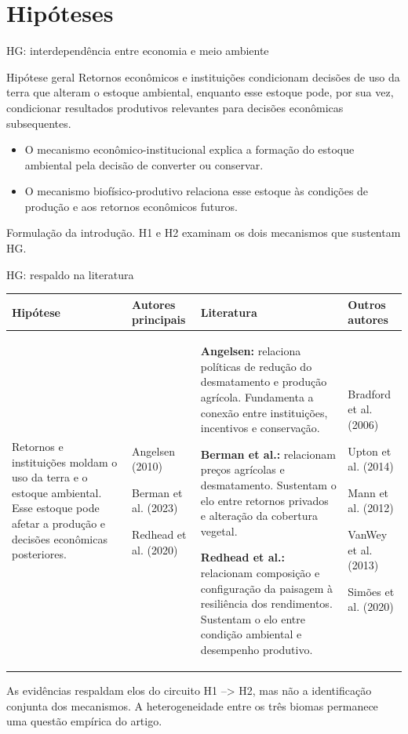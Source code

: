 \documentclass[aspectratio=169,11pt]{beamer}
\newcommand{\fonte}[1]{\par\vfill{\fontsize{7.5}{9}\selectfont\color{gray}#1\par}}
\newcommand{\tpar}{\par\vspace{1.5mm}}
\begin{document}
\section{Hipóteses}
\begin{frame}{HG: interdependência entre economia e meio ambiente}
\begin{block}{Hipótese geral}
Retornos econômicos e instituições condicionam decisões de uso da terra que alteram o estoque ambiental, enquanto esse estoque pode, por sua vez, condicionar resultados produtivos relevantes para decisões econômicas subsequentes.
\end{block}
\medskip
\begin{itemize}
\item O mecanismo econômico-institucional explica a formação do estoque ambiental pela decisão de converter ou conservar.
\medskip
\item O mecanismo biofísico-produtivo relaciona esse estoque às condições de produção e aos retornos econômicos futuros.
\end{itemize}
\fonte{Formulação da introdução. H1 e H2 examinam os dois mecanismos que sustentam HG.}
\end{frame}

\begin{frame}{HG: respaldo na literatura}
\fontsize{8.5}{10.6}\selectfont
\setlength{\tabcolsep}{4pt}
\begin{tabularx}{\textwidth}{P{2.6cm} P{2.25cm} X P{2.25cm}}
\toprule
\textbf{Hipótese} & \textbf{Autores principais} & \textbf{Literatura} & \textbf{Outros autores} \\
\midrule
Retornos e instituições moldam o uso da terra e o estoque ambiental. Esse estoque pode afetar a produção e decisões econômicas posteriores.
& Angelsen (2010)\tpar Berman et al. (2023)\tpar Redhead et al. (2020)
& \textbf{Angelsen:} relaciona políticas de redução do desmatamento e produção agrícola. Fundamenta a conexão entre instituições, incentivos e conservação.\tpar
\textbf{Berman et al.:} relacionam preços agrícolas e desmatamento. Sustentam o elo entre retornos privados e alteração da cobertura vegetal.\tpar
\textbf{Redhead et al.:} relacionam composição e configuração da paisagem à resiliência dos rendimentos. Sustentam o elo entre condição ambiental e desempenho produtivo.
& Bradford et al. (2006)\tpar Upton et al. (2014)\tpar Mann et al. (2012)\tpar VanWey et al. (2013)\tpar Simões et al. (2020) \\
\bottomrule
\end{tabularx}
\fonte{As evidências respaldam elos do circuito H1 --> H2, mas não a identificação conjunta dos mecanismos. A heterogeneidade entre os três biomas permanece uma questão empírica do artigo.}
\end{frame}
\end{document}
